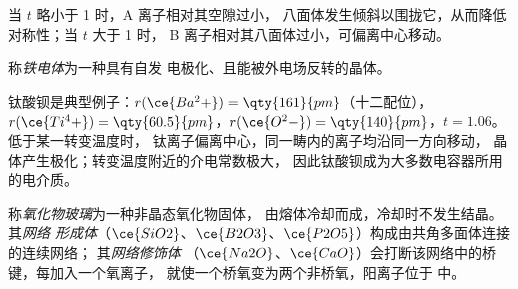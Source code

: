 当 $t$ 略小于 1 时，A 离子相对其空隙过小，
八面体发生倾斜以围拢它，从而降低对称性；当 $t$ 大于 1 时，
B 离子相对其八面体过小，可偏离中心移动。

\begin{definition}[铁电体]\label{def:b3:inorganic-materials:ferroelectric}
称\emph{铁电体}为一种具有自发
电极化、且能被外电场反转的晶体。
\end{definition}

钛酸钡是典型例子：$r(\ce{Ba^2+}) = \qty{161}{pm}$（十二配位），
$r(\ce{Ti^4+}) = \qty{60.5}{pm}$，$r(\ce{O^2-}) = \qty{140}{pm}$，$t = 1.06$。低于某一转变温度时，
钛离子偏离中心，同一畴内的离子均沿同一方向移动，
晶体产生极化；转变温度附近的介电常数极大，
因此钛酸钡成为大多数电容器所用的电介质。

\begin{definition}[氧化物玻璃]\label{def:b3:inorganic-materials:glass}
称\emph{氧化物玻璃}为一种非晶态氧化物固体，
由熔体冷却而成，冷却时不发生结晶。其\emph{网络
形成体}（$\ce{SiO2}$、$\ce{B2O3}$、$\ce{P2O5}$）构成由共角多面体连接的连续网络；
其\emph{网络修饰体}
（$\ce{Na2O}$、$\ce{CaO}$）会打断该网络中的桥键，每加入一个氧离子，
就使一个桥氧变为两个非桥氧，阳离子位于
中。
\end{definition}

